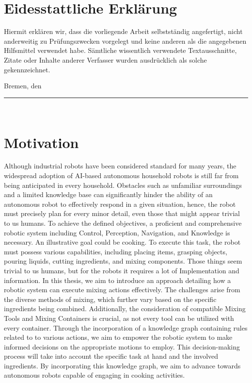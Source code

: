 \documentclass[	pdftex, 
								a4paper,
								11pt, DIV11, BCOR5mm,
								parskip,
								]{scrreprt}
\begin{document}
	\chapter*{Eidesstattliche Erkl\"arung}
	
	Hiermit erkl\"aren wir, dass die vorliegende Arbeit selbstst\"andig angefertigt,
	nicht anderweitig zu Pr\"ufungszwecken vorgelegt und keine anderen als die
	angegebenen Hilfsmittel verwendet habe. S\"amtliche wissentlich verwendete
	Textausschnitte, Zitate oder Inhalte anderer Verfasser wurden ausdr\"ucklich als
	solche gekennzeichnet.
	
	Bremen, den \makeatletter\@date\makeatother
	
	\vspace*{1em}
	\rule{15em}{0.16667pt}\\
	\author{Naser Azizi, Sorin Arion}
	\makeatletter\@author\makeatother
	
	
	\normalem


	\chapter*{Motivation}
	
	Although industrial robots have been considered standard for many years, the widespread adoption of AI-based autonomous household robots is still far from being anticipated in every household.
	Obstacles such as unfamiliar surroundings and a limited knowledge base can significantly hinder the ability of an autonomous robot to effectively respond in a given situation, hence, the robot must precisely plan for every minor detail, even those that might appear trivial to us humans.
	To achieve the defined objectives, a proficient and comprehensive robotic system including Control, Perception, Navigation, and Knowledge is necessary.
	An illustrative goal could be cooking. To execute this task, the robot must possess various capabilities, including placing items, grasping objects, pouring liquids, cutting ingredients, and mixing components.	Those things seem trivial to us humans, but for the robots it requires a lot of Implementation and information.
	In this thesis, we aim to introduce an approach detailing how a robotic system can execute mixing actions effectively.	
	The challenges arise from the diverse methods of mixing, which further vary based on the specific ingredients being combined. Additionally, the consideration of compatible Mixing Tools and Mixing Containers is crucial, as not every tool can be utilized with every container.
	Through the incorporation of a knowledge graph containing rules related to to various actions, we aim to empower the robotic system to make informed decisions on the appropriate motions to employ. This decision-making process will take into account the specific task at hand and the involved ingredients.
	By incorporating this knowledge graph, we aim to advance towards autonomous robots capable of engaging in cooking activities.
\end{document}
